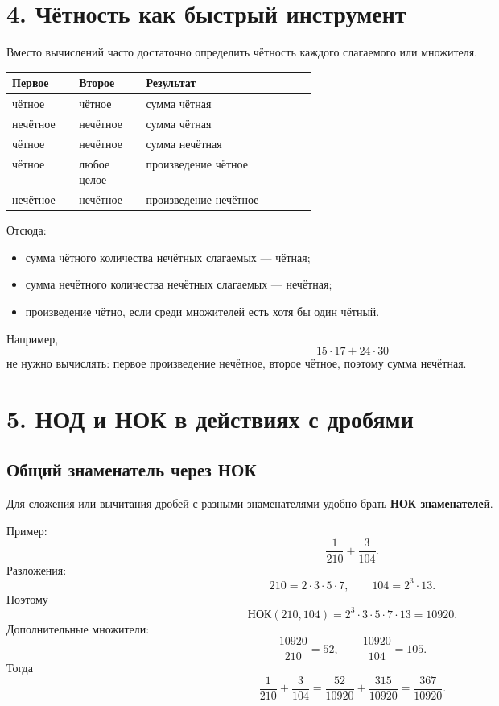 \documentclass[a4paper,12pt]{article}
\newcommand{\noktext}{\text{НОК}}
\newcommand{\key}[1]{\textbf{\color{darkaccent}#1}}
\begin{document}
\section{4. Чётность как быстрый инструмент}

Вместо вычислений часто достаточно определить чётность каждого слагаемого или множителя.

\begin{tabularx}{\linewidth}{>{\centering\arraybackslash}p{0.22\linewidth} >{\centering\arraybackslash}p{0.22\linewidth} X}
\toprule
Первое & Второе & Результат \\
\midrule
чётное & чётное & сумма чётная \\
нечётное & нечётное & сумма чётная \\
чётное & нечётное & сумма нечётная \\
чётное & любое целое & произведение чётное \\
нечётное & нечётное & произведение нечётное \\
\bottomrule
\end{tabularx}

Отсюда:
\begin{itemize}
  \item сумма чётного количества нечётных слагаемых --- чётная;
  \item сумма нечётного количества нечётных слагаемых --- нечётная;
  \item произведение чётно, если среди множителей есть хотя бы один чётный.
\end{itemize}

Например,
\[
15\cdot17+24\cdot30
\]
не нужно вычислять: первое произведение нечётное, второе чётное, поэтому сумма нечётная.

\section{5. НОД и НОК в действиях с дробями}

\subsection{Общий знаменатель через НОК}
Для сложения или вычитания дробей с разными знаменателями удобно брать \key{НОК знаменателей}.

Пример:
\[
\frac{1}{210}+\frac{3}{104}.
\]
Разложения:
\[
210=2\cdot3\cdot5\cdot7,\qquad 104=2^3\cdot13.
\]
Поэтому
\[
\noktext(210,104)=2^3\cdot3\cdot5\cdot7\cdot13=10920.
\]
Дополнительные множители:
\[
\frac{10920}{210}=52,\qquad \frac{10920}{104}=105.
\]
Тогда
\[
\frac{1}{210}+\frac{3}{104}
=\frac{52}{10920}+\frac{315}{10920}
=\boxed{\frac{367}{10920}}.
\]
\end{document}
